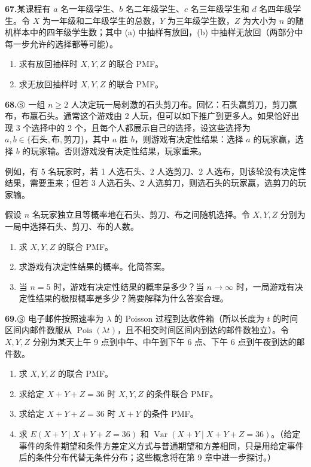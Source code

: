 \documentclass[UTF8,12pt,a4paper,fontset=fandol]{ctexart}
\begin{document}
\noindent\textbf{67.}\quad 某课程有 $a$ 名一年级学生、$b$ 名二年级学生、$c$ 名三年级学生和 $d$ 名四年级学生。令 $X$ 为一年级和二年级学生的总数，$Y$ 为三年级学生数，$Z$ 为大小为 $n$ 的随机样本中的四年级学生数；其中 (a) 中抽样有放回，(b) 中抽样无放回（两部分中每一步允许的选择都等可能）。
\begin{enumerate}
  \item[(a)] 求有放回抽样时 $X,Y,Z$ 的联合 PMF。
  \item[(b)] 求无放回抽样时 $X,Y,Z$ 的联合 PMF。
\end{enumerate}

\noindent\textbf{68.}\quad $\circledS$ 一组 $n\ge 2$ 人决定玩一局刺激的石头剪刀布。回忆：石头赢剪刀，剪刀赢布，布赢石头。通常这个游戏由 2 人玩，但可以如下推广到更多人。如果恰好出现 3 个选择中的 2 个，且每个人都展示自己的选择，设这些选择为 $a,b\in\{\text{石头},\text{布},\text{剪刀}\}$，其中 $a$ 胜 $b$，则游戏有决定性结果：选择 $a$ 的玩家赢，选择 $b$ 的玩家输。否则游戏没有决定性结果，玩家重来。

例如，有 5 名玩家时，若 1 人选石头、2 人选剪刀、2 人选布，则该轮没有决定性结果，需要重来；但若 3 人选石头、2 人选剪刀，则选石头的玩家赢，选剪刀的玩家输。

假设 $n$ 名玩家独立且等概率地在石头、剪刀、布之间随机选择。令 $X,Y,Z$ 分别为一局中选择石头、剪刀、布的人数。
\begin{enumerate}
  \item[(a)] 求 $X,Y,Z$ 的联合 PMF。
  \item[(b)] 求游戏有决定性结果的概率。化简答案。
  \item[(c)] 当 $n=5$ 时，游戏有决定性结果的概率是多少？当 $n\to\infty$ 时，一局游戏有决定性结果的极限概率是多少？简要解释为什么答案合理。
\end{enumerate}

\noindent\textbf{69.}\quad $\circledS$ 电子邮件按照速率为 $\lambda$ 的 Poisson 过程到达收件箱（所以长度为 $t$ 的时间区间内邮件数服从 $\operatorname{Pois}(\lambda t)$，且不相交时间区间内到达的邮件数独立）。令 $X,Y,Z$ 分别为某天上午 9 点到中午、中午到下午 6 点、下午 6 点到午夜到达的邮件数。
\begin{enumerate}
  \item[(a)] 求 $X,Y,Z$ 的联合 PMF。
  \item[(b)] 求给定 $X+Y+Z=36$ 时 $X,Y,Z$ 的条件联合 PMF。
  \item[(c)] 求给定 $X+Y+Z=36$ 时 $X+Y$ 的条件 PMF。
  \item[(d)] 求 $E(X+Y\mid X+Y+Z=36)$ 和 $\operatorname{Var}(X+Y\mid X+Y+Z=36)$。（给定事件的条件期望和条件方差定义方式与普通期望和方差相同，只是用给定事件后的条件分布代替无条件分布；这些概念将在第 9 章中进一步探讨。）
\end{enumerate}
\end{document}
